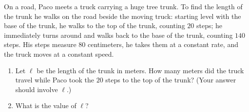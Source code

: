 On a road, Paco meets a truck carrying a huge tree trunk. To find the length of the trunk he walks on the road beside the moving truck: starting level with the base of the trunk, he walks to the top of the trunk, counting $20$ steps; he immediately turns around and walks back to the base of the trunk, counting $140$ steps. His steps measure $80$ centimeters, he takes them at a constant rate, and the truck moves at a constant speed.
\begin{enumerate}
\item[(a)] Let $\ell$ be the length of the trunk in meters. How many meters did the truck travel while Paco took the $20$ steps to the top of the trunk? (Your answer should involve $\ell$.)
\item[(b)] What is the value of $\ell$?
\end{enumerate}
